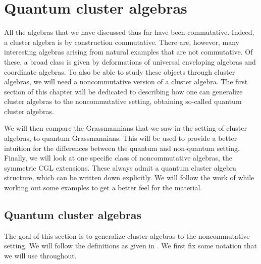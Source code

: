\newcommand{\bbr}{\mathbf{r}}
\newcommand{\bbt}{\mathbf{t}}
\newcommand{\bbq}{\mathbf{q}}
\newcommand{\bbn}{\boldsymbol{\nu}}
\newcommand{\bbl}{\boldsymbol{\lambda}}
\newcommand{\bbg}{\boldsymbol{\gamma}}
\newcommand{\oy}{\overline{y}}
\renewcommand{\oe}{\overline{e}}
\newcommand{\epsbullet}{e_{p(k_\bullet)} + e_{s(k_\bullet)}}
\newcommand{\ekbullet}{e_{k_\bullet}}

\chapter{Quantum cluster algebras}
All the algebras that we have discussed thus far have been commutative. Indeed, a
cluster algebra is by construction commutative. There are, however, many interesting
algebras arising from natural examples that are not commutative. Of these, a broad
class is given by deformations of universal enveloping algebras and coordinate
algebras. To also be able to study these objects through cluster algebras, we will need
a noncommutative version of a cluster algebra. The first section of this chapter will
be dedicated to describing how one can generalize cluster algebras to the
noncommutative setting, obtaining so-called quantum cluster algebras.

We will then compare the Grassmannians that we saw in the setting of cluster algebras,
to quantum Grassmannians. This will be used to provide a better intuition for the
differences between the quantum and non-quantum setting. Finally, we will look at one
specific class of noncommutative algebras, the symmetric CGL extensions. These always
admit a quantum cluster algebra structure, which can be written down explicitly. We
will follow the work of \cite{GoodearlYakimov2017QCA} while working out some examples
to get a better feel for the material.

\section{Quantum cluster algebras}

The goal of this section is to generalize cluster algebras to the noncommutative
setting. We will follow the definitions as given in \cite{GoodearlYakimov2017QCA}. We
first fix some notation that we will use throughout.

